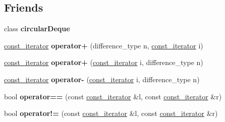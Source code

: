 \subsection*{Friends}
\begin{DoxyCompactItemize}
\item 
\hypertarget{classcircularDeque_1_1const__iterator_aa63d8b47e75b076d05ec6aa14e29109b}{class {\bfseries circular\+Deque}}\label{classcircularDeque_1_1const__iterator_aa63d8b47e75b076d05ec6aa14e29109b}

\item 
\hypertarget{classcircularDeque_1_1const__iterator_a691016b314e13f42d0bb408060c49057}{\hyperlink{classcircularDeque_1_1const__iterator}{const\+\_\+iterator} {\bfseries operator+} (difference\+\_\+type n, \hyperlink{classcircularDeque_1_1const__iterator}{const\+\_\+iterator} i)}\label{classcircularDeque_1_1const__iterator_a691016b314e13f42d0bb408060c49057}

\item 
\hypertarget{classcircularDeque_1_1const__iterator_a1ce501f5fc02fd634576dddb7afdc09a}{\hyperlink{classcircularDeque_1_1const__iterator}{const\+\_\+iterator} {\bfseries operator+} (\hyperlink{classcircularDeque_1_1const__iterator}{const\+\_\+iterator} i, difference\+\_\+type n)}\label{classcircularDeque_1_1const__iterator_a1ce501f5fc02fd634576dddb7afdc09a}

\item 
\hypertarget{classcircularDeque_1_1const__iterator_a39577c462b0d4115f031e1bdfb7b19b5}{\hyperlink{classcircularDeque_1_1const__iterator}{const\+\_\+iterator} {\bfseries operator-\/} (\hyperlink{classcircularDeque_1_1const__iterator}{const\+\_\+iterator} i, difference\+\_\+type n)}\label{classcircularDeque_1_1const__iterator_a39577c462b0d4115f031e1bdfb7b19b5}

\item 
\hypertarget{classcircularDeque_1_1const__iterator_ac7550bfcb9c7fd7ce95bb5d0d45bb076}{bool {\bfseries operator==} (const \hyperlink{classcircularDeque_1_1const__iterator}{const\+\_\+iterator} \&l, const \hyperlink{classcircularDeque_1_1const__iterator}{const\+\_\+iterator} \&r)}\label{classcircularDeque_1_1const__iterator_ac7550bfcb9c7fd7ce95bb5d0d45bb076}

\item 
\hypertarget{classcircularDeque_1_1const__iterator_af9237358f8dba2a676cc09f2ae028e0e}{bool {\bfseries operator!=} (const \hyperlink{classcircularDeque_1_1const__iterator}{const\+\_\+iterator} \&l, const \hyperlink{classcircularDeque_1_1const__iterator}{const\+\_\+iterator} \&r)}\label{classcircularDeque_1_1const__iterator_af9237358f8dba2a676cc09f2ae028e0e}


\end{DoxyCompactItemize}
